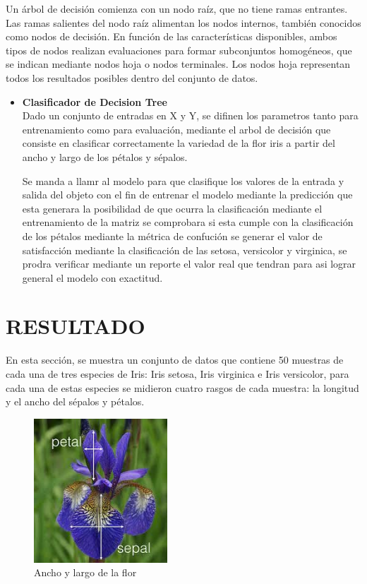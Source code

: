 \documentclass[letterpaper]{article}
\begin{document}
\begin{enumerate}
Un árbol de decisión comienza con un nodo raíz, que no tiene ramas entrantes. Las ramas salientes del nodo raíz alimentan los nodos internos, también conocidos como nodos de decisión. En función de las características disponibles, ambos tipos de nodos realizan evaluaciones para formar subconjuntos homogéneos, que se indican mediante nodos hoja o nodos terminales. Los nodos hoja representan todos los resultados posibles dentro del conjunto de datos.
\begin{itemize}
    \item 
    \textbf{Clasificador de Decision Tree}
    \\Dado un conjunto de entradas en X y Y, se difinen los parametros tanto para entrenamiento como para evaluación, mediante el arbol de decisión que consiste en clasificar correctamente la variedad de la flor iris a partir del ancho y largo de los pétalos y sépalos.
    
    Se manda a llamr al modelo para que clasifique los valores de la entrada y salida del objeto con el fin de entrenar el modelo mediante la predicción que esta generara la posibilidad de que ocurra la clasificación mediante el entrenamiento de la matriz se comprobara si esta cumple con la clasificación de los pétalos mediante la métrica de confución se generar el valor de satisfacción mediante la clasificación de las  setosa, versicolor y virginica, se prodra verificar mediante un reporte el valor real que tendran para asi lograr general el modelo con exactitud. 
\end{itemize}
\end{enumerate}

\section{RESULTADO}
En esta sección, se muestra un conjunto de datos que contiene 50 muestras de cada una de tres especies de Iris: Iris setosa, Iris virginica e Iris versicolor, para cada una de estas especies se midieron cuatro rasgos de cada muestra: la longitud y el ancho del sépalos y pétalos.

\begin{figure}[h]
    \centering
    \includegraphics[width=5cm]{IRIS.jpg}
    \caption{Ancho y largo de la flor}
\end{figure}
\end{document}
